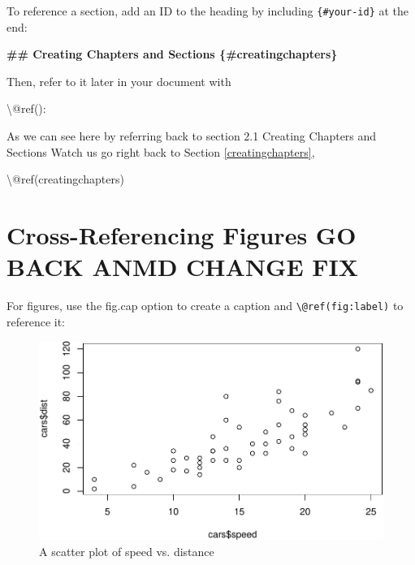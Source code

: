 \documentclass[
]{book}
\newenvironment{Shaded}{\begin{snugshade}}{\end{snugshade}}
\newcommand{\FunctionTok}[1]{\textcolor[rgb]{0.13,0.29,0.53}{\textbf{#1}}}
\newcommand{\NormalTok}[1]{#1}
\newcommand{\SpecialCharTok}[1]{\textcolor[rgb]{0.81,0.36,0.00}{\textbf{#1}}}
\theoremstyle{definition}
\theoremstyle{definition}
\theoremstyle{definition}
\theoremstyle{definition}
\theoremstyle{remark}
\begin{document}
To reference a section, add an ID to the heading by including \texttt{\{\#your-id\}} at the end:

\begin{Shaded}
\begin{Highlighting}[]
\FunctionTok{\#\# Creating Chapters and Sections \{\#creatingchapters\}}
\end{Highlighting}
\end{Shaded}

Then, refer to it later in your document with

\begin{Shaded}
\begin{Highlighting}[]
\NormalTok{\textbackslash{}@ref():}
\end{Highlighting}
\end{Shaded}

As we can see here by referring back to section 2.1 Creating Chapters and Sections
Watch us go right back to Section \ref{creatingchapters},

\begin{Shaded}
\begin{Highlighting}[]
\NormalTok{\textbackslash{}@ref(creatingchapters)}
\end{Highlighting}
\end{Shaded}

\section{Cross-Referencing Figures GO BACK ANMD CHANGE FIX}\label{cross-referencing-figures-go-back-anmd-change-fix}

For figures, use the fig.cap option to create a caption and \texttt{\textbackslash{}@ref(fig:label)} to reference it:

\begin{Shaded}
\end{Shaded}

\begin{figure}

{\centering \includegraphics{_main_files/figure-latex/unnamed-chunk-7-1} 

}

\caption{A scatter plot of speed vs. distance}\label{fig:unnamed-chunk-7}
\end{figure}
\end{document}
